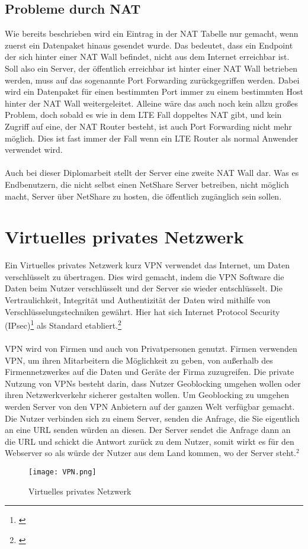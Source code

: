 \subsection{Probleme durch NAT}
Wie bereits beschrieben wird ein Eintrag in der NAT Tabelle nur gemacht, wenn zuerst ein Datenpaket hinaus gesendet wurde. Das bedeutet, dass ein Endpoint der sich hinter einer NAT Wall befindet, nicht aus dem Internet erreichbar ist. Soll also ein Server, der öffentlich erreichbar ist hinter einer NAT Wall betrieben werden, muss auf das sogenannte Port Forwarding zurückgegriffen werden. Dabei wird ein Datenpaket für einen bestimmten Port immer zu einem bestimmten Host hinter der NAT Wall weitergeleitet. Alleine wäre das auch noch kein allzu großes Problem, doch sobald es wie in dem LTE Fall doppeltes NAT gibt, und kein Zugriff auf eine, der NAT Router besteht, ist auch Port Forwarding nicht mehr möglich. Dies ist fast immer der Fall wenn ein LTE Router als normal Anwender verwendet wird.
\\\\
Auch bei dieser Diplomarbeit stellt der Server eine zweite NAT Wall dar. Was es Endbenutzern, die nicht selbst einen NetShare Server betreiben, nicht möglich macht, Server über NetShare zu hosten, die öffentlich zugänglich sein sollen.


\section{Virtuelles privates Netzwerk}
Ein Virtuelles privates Netzwerk kurz VPN verwendet das Internet, um Daten verschlüsselt zu übertragen. Dies wird gemacht, indem die VPN Software die Daten beim Nutzer verschlüsselt und der Server sie wieder entschlüsselt. Die Vertraulichkeit, Integrität und Authentizität der Daten wird mithilfe von Verschlüsselungstechniken gewährt. Hier hat sich Internet Protocol Security (IPsec)\footnote[1]{\cite[Vgl.][]{31}} als Standard etabliert.\footnote[2]{\cite[Vgl.][]{29}}
\\\\
VPN wird von Firmen und auch von Privatpersonen genutzt. Firmen verwenden VPN, um ihren Mitarbeitern die Möglichkeit zu geben, von außerhalb des Firmennetzwerkes auf die Daten und Geräte der Firma zuzugreifen. Die private Nutzung von VPNs besteht darin, dass Nutzer Geoblocking umgehen wollen oder ihren Netzwerkverkehr sicherer gestalten wollen. Um Geoblocking zu umgehen werden Server von den VPN Anbietern auf der ganzen Welt verfügbar gemacht. Die Nutzer verbinden sich zu einem Server, senden die Anfrage, die Sie eigentlich an eine URL senden würden an diesen. Der Server sendet die Anfrage dann an die URL und schickt die Antwort zurück zu dem Nutzer, somit wirkt es für den Webserver so als würde der Nutzer aus dem Land kommen, wo der Server steht.$^{2}$
\begin{figure}[H]
    \centering
    \texttt{[image: VPN.png]}
    \caption[Virtuelles privates Netzwerk]{Virtuelles privates Netzwerk} 
\end{figure} 

